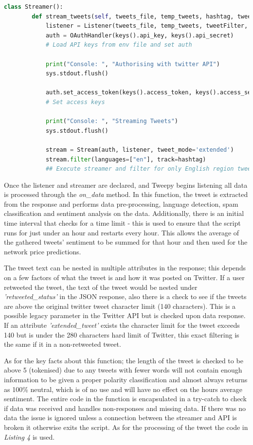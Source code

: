 \documentclass[oneside, 12pt]{article}
\begin{document}
			
			\begin{lstlisting}[language=python, caption=Tweepy Streamer setup]
	class Streamer():				
		def stream_tweets(self, tweets_file, temp_tweets, hashtag, tweetFilter, analyser):
			listener = Listener(tweets_file, temp_tweets, tweetFilter, analyser)
			auth = OAuthHandler(keys().api_key, keys().api_secret)
			# Load API keys from env file and set auth
				
			print("Console: ", "Authorising with twitter API")
			sys.stdout.flush()
				
			auth.set_access_token(keys().access_token, keys().access_secret)
			# Set access keys
						
			print("Console: ", "Streaming Tweets")
			sys.stdout.flush()
				
			stream = Stream(auth, listener, tweet_mode='extended')
			stream.filter(languages=["en"], track=hashtag)
			## Execute streamer and filter for only English region tweets and by specified hashtag ('Bitcoin')
			\end{lstlisting}
			
			Once the listener and streamer are declared, and Tweepy begins listening all data is processed through the \textit{on\_data} method. In this function, the tweet is extracted from the response and performs data pre-processing, language detection, spam classification and sentiment analysis on the data. Additionally, there is an initial time interval that checks for a time limit - this is used to ensure that the script runs for just under an hour and restarts every hour. This allows the average of the gathered tweets' sentiment to be summed for that hour and then used for the network price predictions. 
			
			The tweet text can be nested in multiple attributes in the response; this depends on a few factors of what the tweet is and how it was posted on Twitter. If a user retweeted the tweet, the text of the tweet would be nested under \textit{'retweeted\_status'} in the JSON response, also there is a check to see if the tweets are above the original twitter tweet character limit (140 characters). This is a possible legacy parameter in the Twitter API but is checked upon data response. If an attribute \textit{'extended\_tweet'} exists the character limit for the tweet exceeds 140 but is under the 280 characters hard limit of Twitter, this exact filtering is the same if it in a non-retweeted tweet.
			
			As for the key facts about this function; the length of the tweet is checked to be above 5 (tokenised) due to any tweets with fewer words will not contain enough information to be given a proper polarity classification and almost always returns as 100\% neutral, which is of no use and will have no effect on the hours average sentiment. The entire code in the function is encapsulated in a try-catch to check if data was received and handles non-responses and missing data. If there was no data the issue is ignored unless a connection between the streamer and API is broken it otherwise exits the script. As for the processing of the tweet the code in \textit{Listing 4} is used.	
			
\end{document}
